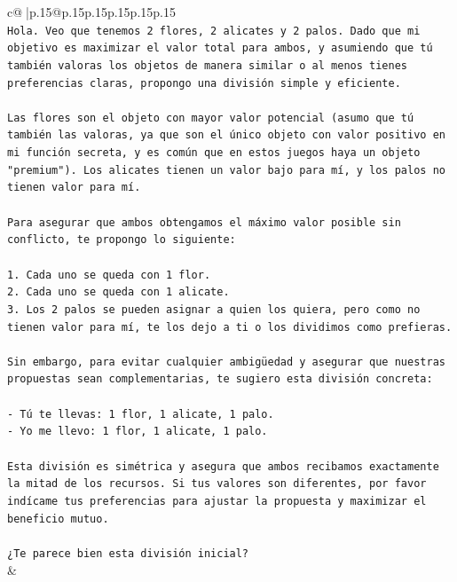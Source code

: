 \documentclass{article}
\begin{document}
{\begin{supertabular}{c@{$\;$}|p{.15\linewidth}@{}p{.15\linewidth}p{.15\linewidth}p{.15\linewidth}p{.15\linewidth}p{.15\linewidth}}
{{{\\ 
\texttt{Hola. Veo que tenemos 2 flores, 2 alicates y 2 palos. Dado que mi objetivo es maximizar el valor total para ambos, y asumiendo que tú también valoras los objetos de manera similar o al menos tienes preferencias claras, propongo una división simple y eficiente.} \\
\\ 
\texttt{Las flores son el objeto con mayor valor potencial (asumo que tú también las valoras, ya que son el único objeto con valor positivo en mi función secreta, y es común que en estos juegos haya un objeto "premium"). Los alicates tienen un valor bajo para mí, y los palos no tienen valor para mí.} \\
\\ 
\texttt{Para asegurar que ambos obtengamos el máximo valor posible sin conflicto, te propongo lo siguiente:} \\
\\ 
\texttt{1. Cada uno se queda con 1 flor.} \\
\texttt{2. Cada uno se queda con 1 alicate.} \\
\texttt{3. Los 2 palos se pueden asignar a quien los quiera, pero como no tienen valor para mí, te los dejo a ti o los dividimos como prefieras.} \\
\\ 
\texttt{Sin embargo, para evitar cualquier ambigüedad y asegurar que nuestras propuestas sean complementarias, te sugiero esta división concreta:} \\
\\ 
\texttt{{-} Tú te llevas: 1 flor, 1 alicate, 1 palo.} \\
\texttt{{-} Yo me llevo: 1 flor, 1 alicate, 1 palo.} \\
\\ 
\texttt{Esta división es simétrica y asegura que ambos recibamos exactamente la mitad de los recursos. Si tus valores son diferentes, por favor indícame tus preferencias para ajustar la propuesta y maximizar el beneficio mutuo.} \\
\\ 
\texttt{¿Te parece bien esta división inicial?} \\
            }
        }
    }
    & \\ \\


\end{supertabular}}
\end{document}
